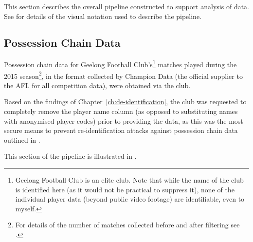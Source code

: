 
This section describes the overall pipeline constructed to support analysis of \afl{} data. See  for details of the visual notation used to describe the pipeline.



\subsection{Possession Chain Data}

Possession chain data for Geelong Football Club's\footnote{Geelong Football Club is an elite \afl{} club. Note that while the name of the club is identified here (as it would not be practical to suppress it), none of the individual player data (beyond public video footage) are identifiable, even to myself.} matches played during the 2015 season\footnote{For details of the number of matches collected before and after filtering see .}, in the format collected by Champion Data (the official supplier to the AFL for all competition data), were obtained via the club. 

Based on the findings of Chapter~\ref{ch:de-identification}, the club was requested to completely remove the player name column (as opposed to substituting names with anonymised player codes) prior to providing the data, as this was the most secure means to prevent re-identification attacks against possession chain data outlined in .

This section of the pipeline is illustrated in .


